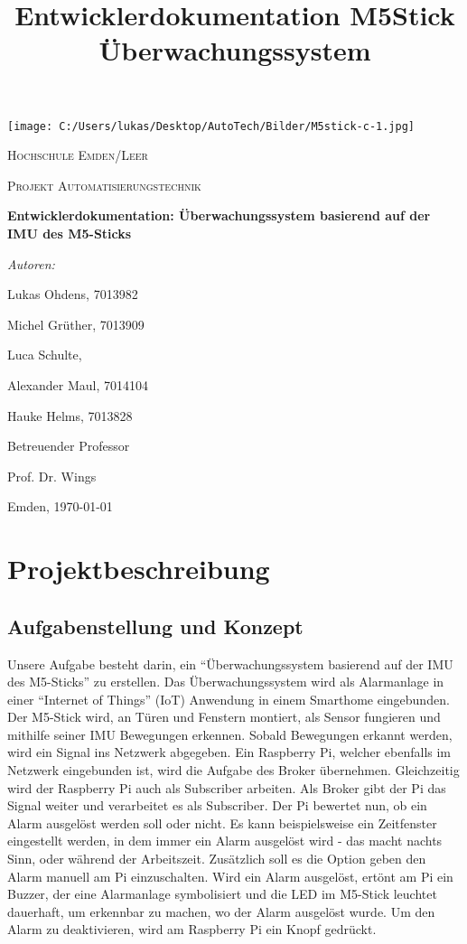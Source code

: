 \documentclass[a4paper,12pt]{article}
\title{Entwicklerdokumentation M5Stick Überwachungssystem}
\begin{document}
\begin{titlepage}
	\centering
	\texttt{[image: C:/Users/lukas/Desktop/AutoTech/Bilder/M5stick-c-1.jpg]}\par\vspace{1cm}
	{\scshape\LARGE Hochschule Emden/Leer \par}
	\vspace{1cm}
	{\scshape\Large Projekt Automatisierungstechnik\par}
	\vspace{1.5cm}
	{\huge\bfseries Entwicklerdokumentation: Überwachungssystem basierend
	auf der IMU des
	M5-Sticks\par}
	\vspace{2cm}
	{\Large\itshape Autoren:\par {Lukas Ohdens, 7013982\par
	Michel Grüther, 7013909\par Luca Schulte, \par Alexander
	Maul, 7014104\par Hauke Helms, 7013828}\par}
	\vfill
	Betreuender Professor\par
	Prof. Dr. Wings

	\vfill

	{\large Emden, \today\par}
\end{titlepage}

\tableofcontents
\newpage

\section{Projektbeschreibung}
\subsection{Aufgabenstellung und Konzept}
Unsere Aufgabe besteht darin, ein “Überwachungssystem basierend auf der IMU des M5-Sticks” zu erstellen. Das Überwachungssystem wird als Alarmanlage in einer “Internet of Things” (IoT) Anwendung in einem Smarthome eingebunden. Der M5-Stick wird, an Türen und Fenstern montiert, als Sensor fungieren und mithilfe seiner IMU Bewegungen erkennen. Sobald Bewegungen erkannt werden, wird ein Signal ins Netzwerk abgegeben. Ein Raspberry Pi, welcher ebenfalls im Netzwerk eingebunden ist, wird die Aufgabe des Broker übernehmen. Gleichzeitig wird der Raspberry Pi auch als Subscriber arbeiten. Als Broker gibt der Pi das Signal weiter und verarbeitet es als Subscriber. Der Pi bewertet nun, ob ein Alarm ausgelöst werden soll oder nicht. Es kann beispielsweise ein Zeitfenster eingestellt werden, in dem immer ein Alarm ausgelöst wird - das macht nachts Sinn, oder während der Arbeitszeit. Zusätzlich soll es die Option geben den Alarm manuell am Pi einzuschalten. Wird ein Alarm ausgelöst, ertönt am Pi ein Buzzer, der eine Alarmanlage symbolisiert und die LED im M5-Stick leuchtet dauerhaft, um erkennbar zu machen, wo der Alarm ausgelöst wurde. Um den Alarm zu deaktivieren, wird am Raspberry Pi ein Knopf gedrückt.
\end{document}
